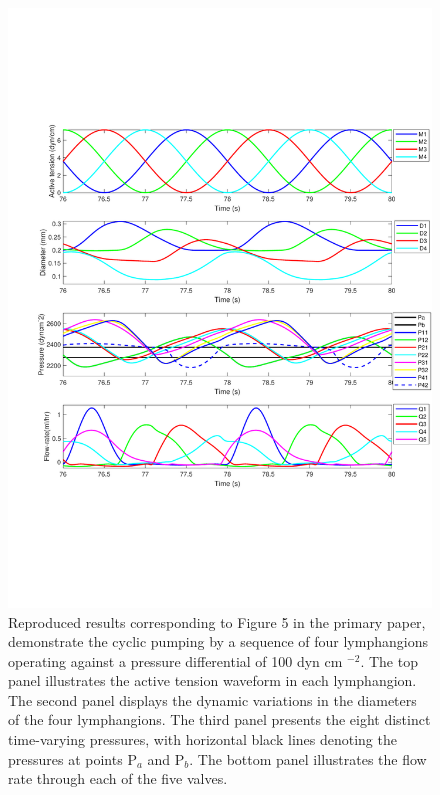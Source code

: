 \documentclass[fleqn,10pt]{physiome}
\begin{document}
\begin{figure}[p]\centering
\includegraphics[trim=1.25cm 5.0cm 0.0cm 0.0cm, clip=true, totalheight=0.75\textheight, ]{figure_3_reproduced.pdf}
\caption{Reproduced results corresponding to Figure 5 in the primary paper, demonstrate the cyclic pumping by a sequence of four lymphangions operating against a pressure differential of 100 dyn cm $^{-2}$. The top panel illustrates the active tension waveform in each lymphangion. The second panel displays the dynamic variations in the diameters of the four lymphangions. The third panel presents the eight distinct time-varying pressures, with horizontal black lines denoting the pressures at points P$_{a}$ and P$_{b}$. The bottom panel illustrates the flow rate through each of the five valves.}
\label{fig:reproduced_2}
\end{figure}
\end{document}
